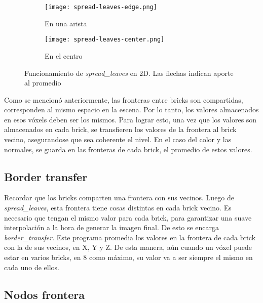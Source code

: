 \begin{figure}
    \begin{subfigure}{.5\textwidth}
        \centering
        \texttt{[image: spread-leaves-edge.png]}
        \caption{En una arista}
    \end{subfigure}
    \begin{subfigure}{.5\textwidth}
        \centering
        \texttt{[image: spread-leaves-center.png]}
        \caption{En el centro}
    \end{subfigure}
    \caption{Funcionamiento de \textit{spread\_leaves} en 2D. Las flechas indican aporte al promedio}
    \label{fig:spread-leaves}
\end{figure}


Como se mencionó anteriormente, las fronteras entre bricks son compartidas, corresponden al mismo espacio en la escena.
Por lo tanto, los valores almacenados en esos vóxels deben ser los mismos.
Para lograr esto, una vez que los valores son almacenados en cada brick, se transfieren los valores de la frontera al brick vecino, asegurandose que sea coherente el nivel.
En el caso del color y las normales, se guarda en las fronteras de cada brick, el promedio de estos valores.

\subsection{Border transfer}\label{sec:border_transfer}

Recordar que los bricks comparten una frontera con sus vecinos.
Luego de \textit{spread\_leaves}, esta frontera tiene cosas distintas en cada brick vecino.
Es necesario que tengan el mismo valor para cada brick, para garantizar una suave interpolación a la hora de generar la imagen final.
De esto se encarga \textit{border\_transfer}.
Este programa promedia los valores en la frontera de cada brick con la de sus vecinos, en X, Y y Z.
De esta manera, aún cuando un vóxel puede estar en varios bricks, en $8$ como máximo, su valor va a ser siempre el mismo en cada uno de ellos.


\subsection{Nodos frontera}

